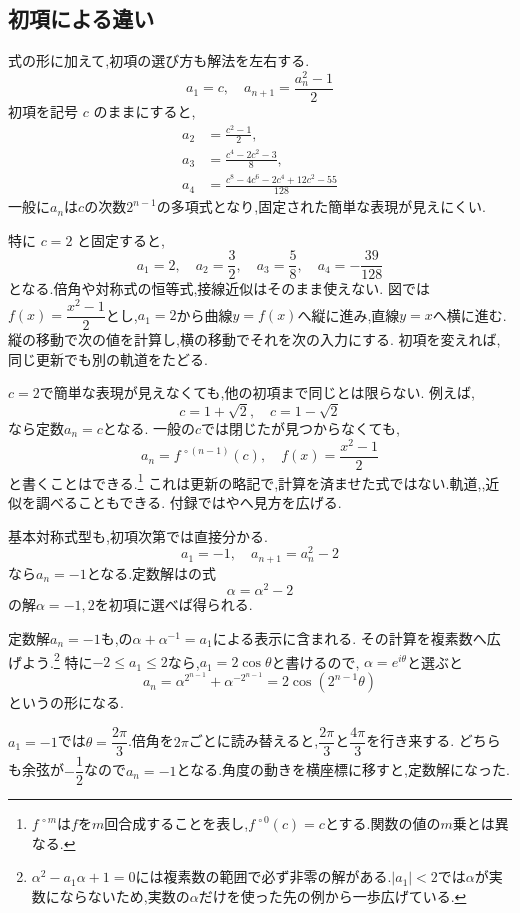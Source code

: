 \subsection{初項による違い}\label{節：初項による違い}

式の形に加えて,初項の選び方も解法を左右する.
\[
  a_1=c,
  \quad
  a_{n+1}=\frac{a_n^2-1}{2}
\]
初項を記号 $c$ のままにすると,
\begin{align*}
  a_2&=\frac{c^2-1}{2},\\
  a_3&=\frac{c^4-2c^2-3}{8},\\
  a_4&=\frac{c^8-4c^6-2c^4+12c^2-55}{128}
\end{align*}
一般に$a_n$は$c$の次数$2^{n-1}$の多項式となり,固定された簡単な表現が見えにくい.

特に $c=2$ と固定すると,
\[
  a_1=2,
  \quad
  a_2=\frac{3}{2},
  \quad
  a_3=\frac{5}{8},
  \quad
  a_4=-\frac{39}{128}
\]
となる.倍角や対称式の恒等式,接線近似はそのまま使えない.
図では$f(x)=\dfrac{x^2-1}{2}$とし,$a_1=2$から曲線$y=f(x)$へ縦に進み,直線$y=x$へ横に進む.
縦の移動で次の値を計算し,横の移動でそれを次の入力にする.
初項を変えれば,同じ更新でも別の軌道をたどる.
\BookFigCobweb

$c=2$で簡単な表現が見えなくても,他の初項まで同じとは限らない.
例えば,
\[
  c=1+\sqrt{2},
  \quad
  c=1-\sqrt{2}
\]
なら定数$a_n=c$となる.
一般の$c$では閉じたが見つからなくても,
\[
  a_n=f^{\,\circ(n-1)}(c),
  \quad
  f(x)=\frac{x^2-1}{2}
\]
と書くことはできる.\footnote{$f^{\,\circ m}$は$f$を$m$回合成することを表し,$f^{\,\circ0}(c)=c$とする.関数の値の$m$乗とは異なる.}
これは更新の略記で,計算を済ませた式ではない.軌道,,近似を調べることもできる.
付録ではやへ見方を広げる.

基本対称式型も,初項次第では直接分かる.
\[
  a_1=-1,\quad a_{n+1}=a_n^2-2
\]
なら$a_n=-1$となる.定数解はの式
\[
  \alpha=\alpha^2-2
\]
の解$\alpha=-1,2$を初項に選べば得られる.

定数解$a_n=-1$も,の$\alpha+\alpha^{-1}=a_1$による表示に含まれる.
その計算を複素数へ広げよう.\footnote{$\alpha^2-a_1\alpha+1=0$には複素数の範囲で必ず非零の解がある.$|a_1|<2$では$\alpha$が実数にならないため,実数の$\alpha$だけを使った先の例から一歩広げている.}
特に$-2\le a_1\le2$なら,$a_1=2\cos\theta$と書けるので,
$\alpha=e^{i\theta}$と選ぶと
\[
  a_n=\alpha^{2^{n-1}}+\alpha^{-2^{n-1}}=2\cos(2^{n-1}\theta)
\]
というの形になる.

$a_1=-1$では$\theta=\dfrac{2\pi}{3}$.倍角を$2\pi$ごとに読み替えると,$\dfrac{2\pi}{3}$と$\dfrac{4\pi}{3}$を行き来する.
どちらも余弦が$-\dfrac{1}{2}$なので$a_n=-1$となる.角度の動きを横座標に移すと,定数解になった.
